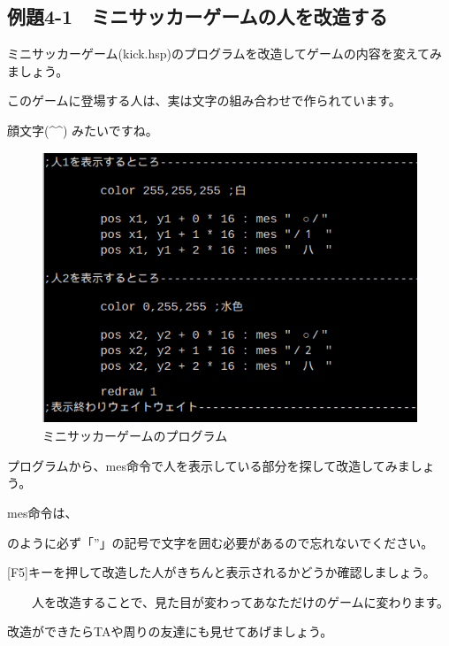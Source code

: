 \newpage
\subsection{例題4-1　ミニサッカーゲームの人を改造する}

\begin{description}
    \item {}
\end{description}

ミニサッカーゲーム(kick.hsp)のプログラムを改造してゲームの内容を変えてみましょう。

このゲームに登場する人は、実は文字の組み合わせで作られています。

顔文字(\^{}\^{}) みたいですね。


\begin{figure}[H]
    \begin{center}
      \includegraphics[keepaspectratio,width=12.326cm,height=8.123cm]{text04-img/text04-img007.png}
      \caption{ミニサッカーゲームのプログラム}
    \end{center}
    \label{fig:prog_menu}
\end{figure}



プログラムから、mes命令で人を表示している部分を探して改造してみましょう。

mes命令は、

\begin{description}
    \item {}
\end{description}


のように必ず「”」の記号で文字を囲む必要があるので忘れないでください。

\begin{description}
    \item {}
\end{description}


[F5]キーを押して改造した人がきちんと表示されるかどうか確認しましょう。

\ \ \ \ 人を改造することで、見た目が変わってあなただけのゲームに変わります。

改造ができたらTAや周りの友達にも見せてあげましょう。






